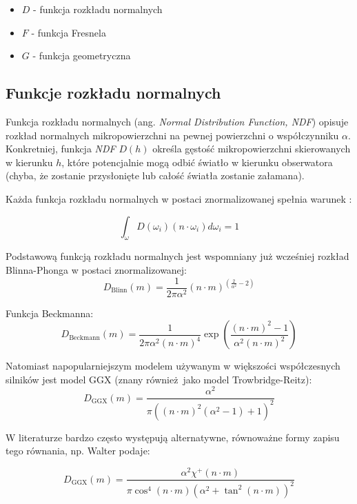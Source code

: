 \documentclass[../main.tex]{subfiles}
\begin{document}
\begin{itemize}
  \item $D$ - funkcja rozkładu normalnych
  \item $F$ - funkcja Fresnela
  \item $G$ - funkcja geometryczna
\end{itemize}

\subsection{Funkcje rozkładu normalnych}

Funkcja rozkładu normalnych (ang. \textit{Normal Distribution Function, NDF})
opisuje rozkład normalnych mikropowierzchni na pewnej powierzchni o
współczynniku $\alpha$. Konkretniej, funkcja \textit{NDF} $D(h)$ określa
gęstość mikropowierzchni skierowanych w kierunku $h$, które potencjalnie mogą
odbić światło w kierunku obserwatora (chyba, że zostanie przysłonięte lub
całość światła zostanie załamana).

Każda funkcja rozkładu normalnych w postaci znormalizowanej spełnia warunek
\cite{NDFReed}:

\[
  \int_{\omega} {
    D(\omega_i)
    (n \cdot \omega_i)
    d \omega_i
  } = 1
\]

Podstawową funkcją rozkładu normalnych jest wspomniany już wcześniej rozkład
Blinna-Phonga w postaci znormalizowanej:
\[
  D_{\text{Blinn}}(m) =
    \frac{1}{2\pi\alpha^2}
    (n \cdot m)^{(\frac{2}{\alpha^2} - 2)}
\]

Funkcja Beckmanna:
\[
  D_{\text{Beckmann}}(m) =
    \frac{1}{2\pi\alpha^2 (n \cdot m)^{4}}
    \exp\left(
      \frac{
        (n \cdot m)^2 - 1
      }{
        \alpha^2 (n \cdot m)^2
      }
    \right)
\]

Natomiast napopularniejszym modelem używanym w większości współczesnych silników
jest model GGX (znany również jako model Trowbridge-Reitz):
\[
  D_{\text{GGX}}(m) =
    \frac{
      \alpha^2
    }{
      \pi \left(
        \left(n \cdot m \right)^{2}
        \left(\alpha^2 - 1 \right)
        + 1
      \right)^2
    }
\]

W literaturze bardzo często występują alternatywne, równoważne formy zapisu
tego równania, np. Walter podaje: %

\[
  D_{\text{GGX}}(m) =
    \frac{\alpha^2 \chi^{+}(n \cdot m)}{
      \pi \cos^{4} (n \cdot m) \left( \alpha^2 + \tan^2 (n \cdot m) \right)^2
    }
\]
\end{document}
